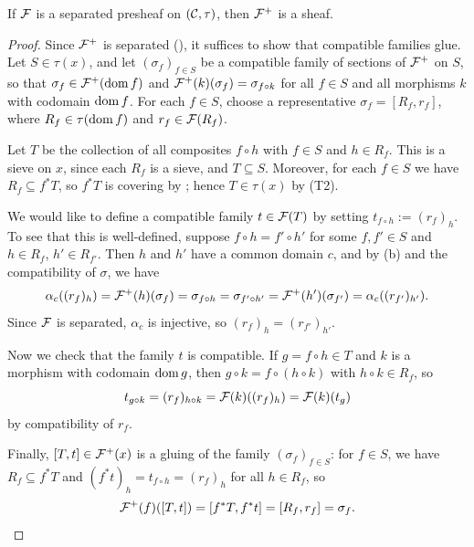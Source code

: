 \begin{proposition}\label{prop:chap:sheaves:sec:sites:plus construction of separated presheaf is a sheaf}
    If $\cal{F}$ is a separated presheaf on $(\catC,\tau)$, then $\cal{F}^+$ is a sheaf.
\end{proposition}
\begin{proof}
    Since $\cal{F}^+$ is separated (), it suffices to show that compatible families glue. Let $S \in \tau(x)$, and let $(\sigma_f)_{f \in S}$ be a compatible family of sections of $\cal{F}^+$ on $S$, so that $\sigma_f \in \cal{F}^+(\dom f)$ and $\cal{F}^+(k)(\sigma_f) = \sigma_{f \circ k}$ for all $f \in S$ and all morphisms $k$ with codomain $\dom f$. For each $f \in S$, choose a representative $\sigma_f = [R_f, r_f]$, where $R_f \in \tau(\dom f)$ and $r_f \in \cal{F}(R_f)$.

    Let $T$ be the collection of all composites $f \circ h$ with $f \in S$ and $h \in R_f$. This is a sieve on $x$, since each $R_f$ is a sieve, and $T \subseteq S$. Moreover, for each $f \in S$ we have $R_f \subseteq f^* T$, so $f^* T$ is covering by ; hence $T \in \tau(x)$ by (T2).

    We would like to define a compatible family $t \in \cal{F}(T)$ by setting $t_{f \circ h} := (r_f)_h$. To see that this is well-defined, suppose $f \circ h = f' \circ h'$ for some $f, f' \in S$ and $h \in R_f$, $h' \in R_{f'}$. Then $h$ and $h'$ have a common domain $c$, and by (b) and the compatibility of $\sigma$, we have
    \[\alpha_c((r_f)_h) = \cal{F}^+(h)(\sigma_f) = \sigma_{f \circ h} = \sigma_{f' \circ h'} = \cal{F}^+(h')(\sigma_{f'}) = \alpha_c((r_{f'})_{h'}).\]
    Since $\cal{F}$ is separated, $\alpha_c$ is injective, so $(r_f)_h = (r_{f'})_{h'}$.

    Now we check that the family $t$ is compatible. If $g = f \circ h \in T$ and $k$ is a morphism with codomain $\dom g$, then $g \circ k = f \circ (h \circ k)$ with $h \circ k \in R_f$, so
    \[t_{g \circ k} = (r_f)_{h \circ k} = \cal{F}(k)((r_f)_h) = \cal{F}(k)(t_g)\]
    by compatibility of $r_f$.

    Finally, $[T,t] \in \cal{F}^+(x)$ is a gluing of the family $(\sigma_f)_{f \in S}$: for $f \in S$, we have $R_f \subseteq f^* T$ and $(f^* t)_h = t_{f \circ h} = (r_f)_h$ for all $h \in R_f$, so
    \[\cal{F}^+(f)([T,t]) = [f^* T, f^* t] = [R_f, r_f] = \sigma_f. \qedhere\]
\end{proof}

